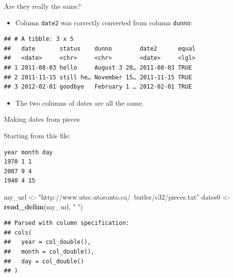 \documentclass[
  ignorenonframetext,
]{beamer}
\newenvironment{Shaded}{\begin{snugshade}}{\end{snugshade}}
\newcommand{\DataTypeTok}[1]{\textcolor[rgb]{0.13,0.29,0.53}{#1}}
\newcommand{\KeywordTok}[1]{\textcolor[rgb]{0.13,0.29,0.53}{\textbf{#1}}}
\newcommand{\NormalTok}[1]{#1}
\newcommand{\OperatorTok}[1]{\textcolor[rgb]{0.81,0.36,0.00}{\textbf{#1}}}
\newcommand{\StringTok}[1]{\textcolor[rgb]{0.31,0.60,0.02}{#1}}
\providecommand{\tightlist}{%
  \setlength{\itemsep}{0pt}\setlength{\parskip}{0pt}}
\begin{document}
\begin{frame}[fragile]{Are they really the same?}
\protect\hypertarget{are-they-really-the-same}{}

\begin{itemize}
\tightlist
\item
  Column \texttt{date2} was correctly converted from column
  \texttt{dunno}:
\end{itemize}

\begin{Shaded}
\end{Shaded}

\begin{verbatim}
## # A tibble: 3 x 5
##   date       status    dunno        date2      equal
##   <date>     <chr>     <chr>        <date>     <lgl>
## 1 2011-08-03 hello     August 3 20… 2011-08-03 TRUE 
## 2 2011-11-15 still he… November 15… 2011-11-15 TRUE 
## 3 2012-02-01 goodbye   February 1 … 2012-02-01 TRUE
\end{verbatim}

\begin{itemize}
\tightlist
\item
  The two columns of dates are all the same.
\end{itemize}

\end{frame}

\begin{frame}[fragile]{Making dates from pieces}
\protect\hypertarget{making-dates-from-pieces}{}

Starting from this file:

\begin{verbatim}
year month day
1970 1 1
2007 9 4
1940 4 15
\end{verbatim}

\begin{Shaded}
\begin{Highlighting}[]
\NormalTok{my_url <-}\StringTok{ "http://www.utsc.utoronto.ca/~butler/c32/pieces.txt"}
\NormalTok{dates0 <-}\StringTok{ }\KeywordTok{read_delim}\NormalTok{(my_url, }\StringTok{" "}\NormalTok{)}
\end{Highlighting}
\end{Shaded}

\begin{verbatim}
## Parsed with column specification:
## cols(
##   year = col_double(),
##   month = col_double(),
##   day = col_double()
## )
\end{verbatim}

\end{frame}
\end{document}
